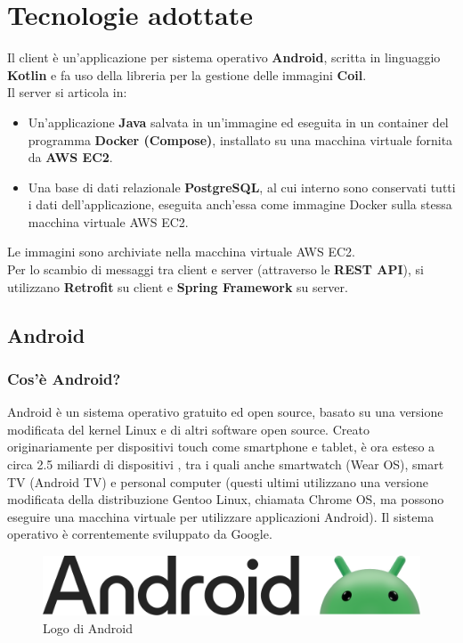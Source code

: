     \section{Tecnologie adottate}
        Il client è un'applicazione per sistema operativo \textbf{Android}, scritta in linguaggio \textbf{Kotlin} e fa uso della libreria per la gestione delle immagini \textbf{Coil}. \\
        Il server si articola in:
        \begin{itemize}
            \item Un'applicazione \textbf{Java} salvata in un'immagine ed eseguita in un container del programma \textbf{Docker (Compose)}, installato su una macchina virtuale fornita da \textbf{AWS EC2}.
            \item Una base di dati relazionale \textbf{PostgreSQL}, al cui interno sono conservati tutti i dati dell'applicazione, eseguita anch'essa come immagine Docker sulla stessa macchina virtuale AWS EC2.
        \end{itemize}
        Le immagini sono archiviate nella macchina virtuale AWS EC2. \\
        Per lo scambio di messaggi tra client e server (attraverso le \textbf{REST API}), si utilizzano \textbf{Retrofit} su client e \textbf{Spring Framework} su server. \\

        \subsection{Android}
            \subsubsection{Cos'è Android? \cite{Wikipedia1}}
                Android è un sistema operativo gratuito ed open source, basato su una versione modificata del kernel Linux e di altri software open source. Creato originariamente per dispositivi touch come smartphone e tablet, è ora esteso a circa 2.5 miliardi di dispositivi \cite{Google1}, tra i quali anche smartwatch (Wear OS), smart TV (Android TV) e personal computer (questi ultimi utilizzano una versione modificata della distribuzione Gentoo Linux, chiamata Chrome OS, ma possono eseguire una macchina virtuale per utilizzare applicazioni Android). Il sistema operativo è correntemente sviluppato da Google.
            \begin{figure}[htbp!]
                \centering
                \includegraphics[width=0.5\linewidth]{Immagini/System Design/Android.png}
                \caption{Logo di Android}
            \end{figure}
